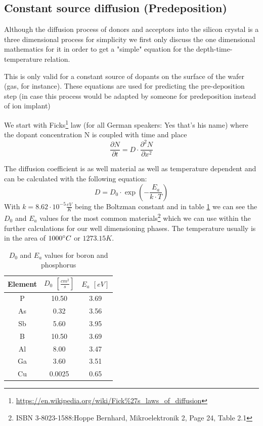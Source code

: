 \subsection{Constant source diffusion (Predeposition)}

Although the diffusion process of donors and acceptors into the silicon crystal is a three dimensional process for simplicity we first only discuss the one dimensional mathematics for it in order to get a "simple" equation for the depth-time-temperature relation.

\begin{mdframed}[linewidth=2pt,linecolor=red]
This is only valid for a constant source of dopants on the surface of the wafer (gas, for instance).
These equations are used for predicting the pre-deposition step (in case this process would be adapted by someone for predeposition instead of ion implant)
\end{mdframed}

We start with Ficks\footnote{\url{https://en.wikipedia.org/wiki/Fick\%27s_laws_of_diffusion}} law (for all German speakers: Yes that's his name) where the dopant concentration N is coupled with time and place
\begin{equation}
\frac{\partial N}{\partial t} = D \cdot \frac{\partial^2 N}{\partial x^2}
\end{equation}

The diffusion coefficient is as well material as well as temperature dependent  and can be calculated with the following equation:
\begin{equation}
D = D_0 \cdot \exp\left(-\frac{E_a}{k \cdot T}\right)
\end{equation}
With $k=8.62 \cdot 10^{-5} \frac{eV}{K}$ being the Boltzman constant and in table \ref{table:absolute_diffusion_coefficients} we can see the $D_0$ and $E_a$ values for the most common materials\footnote{ISBN 3-8023-1588:Hoppe Bernhard, Mikroelektronik 2, Page 24, Table 2.1} which we can use within the further calculations for our well dimensioning phases. The temperature usually is in the area of $1000\degree C$ or $1273.15 K$.
\begin{table}[H]
	\label{table:absolute_diffusion_coefficients}
	\centering
	\begin{tabular}{|c|c|c|}
		\hline
		Element &
		$D_0$ $\left[\frac{cm^2}{s}\right]$ &
		$E_a$ $\left[eV\right]$ \\
		\hline
		P &
		10.50 &
		3.69 \\
		\hline
		As &
		0.32 &
		3.56 \\
		\hline
		Sb &
		5.60 &
		3.95 \\
		\hline
		B &
		10.50 &
		3.69 \\
		\hline
		Al &
		8.00 &
		3.47 \\
		\hline
		Ga &
		3.60 &
		3.51 \\
		\hline
		Cu &
		0.0025 &
		0.65 \\
		\hline
	\end{tabular}
	\caption{$D_0$ and $E_a$ values for boron and phosphorus}
\end{table}

